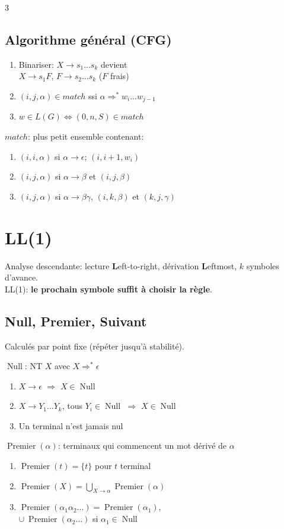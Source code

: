 \documentclass[12pt, a4paper]{article}
\newcommand{\Null}{\operatorname{Null}}
\newcommand{\Prem}{\operatorname{Premier}}
\begin{document}
\begin{multicols*}{3}
	\subsection{Algorithme général (CFG)}
	\begin{enumerate}[\roman*.]
		\item Binariser: $X\rightarrow s_1\ldots s_k$ devient\\$X\rightarrow s_1F$, $F\rightarrow s_2\ldots s_k$ ($F$ frais)
		\item $(i,j,\alpha)\in match$ ssi $\alpha\Rightarrow^*w_i\ldots w_{j-1}$
		\item $w\in L(G)\iff(0,n,S)\in match$
	\end{enumerate}
	$match$: plus petit ensemble contenant:
	\begin{enumerate}[\roman*.]
		\item $(i,i,\alpha)$ si $\alpha\rightarrow\epsilon$; $(i,i+1,w_i)$
		\item $(i,j,\alpha)$ si $\alpha\rightarrow\beta$ et $(i,j,\beta)$
		\item $(i,j,\alpha)$ si $\alpha\rightarrow\beta\gamma$, $(i,k,\beta)$ et $(k,j,\gamma)$
	\end{enumerate}
 
  \colbreak
	\section{LL(1)}
	Analyse descendante: lecture \textbf{L}eft-to-right, dérivation \textbf{L}eftmost, $k$ symboles d'avance.\\
	LL(1): \textbf{le prochain symbole suffit à choisir la règle}.
 
	\subsection{Null, Premier, Suivant}
	Calculés par point fixe (répéter jusqu'à stabilité).
 
	$\Null$: NT $X$ avec $X\Rightarrow^*\epsilon$
	\begin{enumerate}[\roman*.]
		\item $X\rightarrow\epsilon$ $\Rightarrow$ $X\in\Null$
		\item $X\rightarrow Y_1\ldots Y_k$, tous $Y_i\in\Null$ $\Rightarrow$ $X\in\Null$
		\item Un terminal n'est jamais nul
	\end{enumerate}
 
	$\Prem(\alpha)$: terminaux qui commencent un mot dérivé de $\alpha$
	\begin{enumerate}[\roman*.]
		\item $\Prem(t)=\{t\}$ pour $t$ terminal
		\item $\Prem(X)=\bigcup_{X\rightarrow\alpha}\Prem(\alpha)$
		\item $\Prem(\alpha_1\alpha_2\ldots)=\Prem(\alpha_1)$,\\$\cup\ \Prem(\alpha_2\ldots)$ si $\alpha_1\in\Null$
	\end{enumerate}
 

\end{multicols*}
\end{document}
